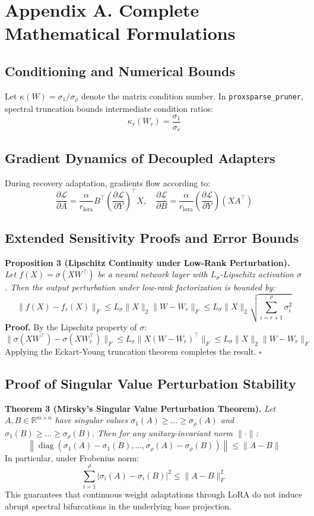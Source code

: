 \section*{Appendix A. Complete Mathematical Formulations}

\subsection*{Conditioning and Numerical Bounds}
Let $\kappa(W) = \sigma_1 / \sigma_\rho$ denote the matrix condition number. In \texttt{proxsparse\_pruner}, spectral truncation bounds intermediate condition ratios:
\[
\kappa_r(W_r) = \frac{\sigma_1}{\sigma_r}
\]

\subsection*{Gradient Dynamics of Decoupled Adapters}
During recovery adaptation, gradients flow according to:
\[
\frac{\partial \mathcal{L}}{\partial A} = \frac{\alpha}{r_{\text{lora}}} B^\top \left( \frac{\partial \mathcal{L}}{\partial Y} \right)^\top X, \quad \frac{\partial \mathcal{L}}{\partial B} = \frac{\alpha}{r_{\text{lora}}} \left( \frac{\partial \mathcal{L}}{\partial Y} \right) (X A^\top)
\]

\subsection*{Extended Sensitivity Proofs and Error Bounds}
\textbf{Proposition 3 (Lipschitz Continuity under Low-Rank Perturbation).} \textit{Let $f(X) = \sigma(X W^\top)$ be a neural network layer with $L_\sigma$-Lipschitz activation $\sigma$. Then the output perturbation under low-rank factorization is bounded by:}
\[
\|f(X) - f_r(X)\|_F \le L_\sigma \|X\|_2 \|W - W_r\|_F \le L_\sigma \|X\|_2 \sqrt{\sum_{i=r+1}^\rho \sigma_i^2}
\]
\textbf{Proof.} By the Lipschitz property of $\sigma$:
\[
\|\sigma(X W^\top) - \sigma(X W_r^\top)\|_F \le L_\sigma \|X (W - W_r)^\top\|_F \le L_\sigma \|X\|_2 \|W - W_r\|_F
\]
Applying the Eckart-Young truncation theorem completes the result. $\square$

\subsection*{Proof of Singular Value Perturbation Stability}
\textbf{Theorem 3 (Mirsky's Singular Value Perturbation Theorem).} \textit{Let $A, B \in \mathbb{R}^{m \times n}$ have singular values $\sigma_1(A) \ge \dots \ge \sigma_\rho(A)$ and $\sigma_1(B) \ge \dots \ge \sigma_\rho(B)$. Then for any unitary-invariant norm $\|\cdot\|$:}
\[
\left\| \operatorname{diag}(\sigma_1(A) - \sigma_1(B), \dots, \sigma_\rho(A) - \sigma_\rho(B)) \right\| \le \|A - B\|
\]
In particular, under Frobenius norm:
\[
\sum_{i=1}^\rho |\sigma_i(A) - \sigma_i(B)|^2 \le \|A - B\|_F^2
\]
This guarantees that continuous weight adaptations through LoRA do not induce abrupt spectral bifurcations in the underlying base projection.

